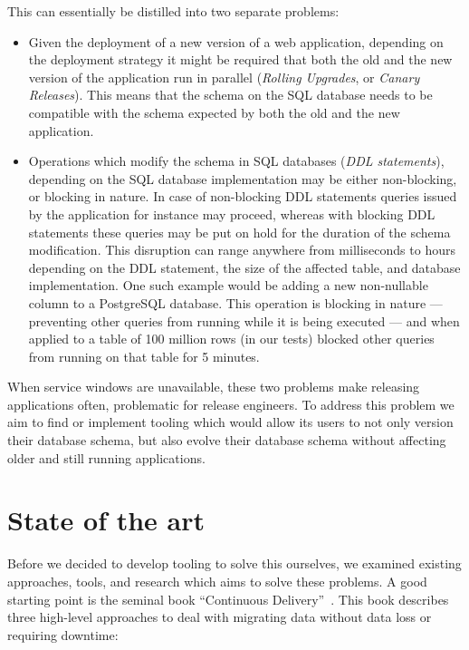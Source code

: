 \documentclass[conference]{IEEEtran}
\begin{document}
This can essentially be distilled into two separate problems:
\begin{itemize}
  \item{Given the deployment of a new version of a web application, depending on the deployment strategy it might be required that both the old and the new version of the application run in parallel (\textit{Rolling Upgrades}, or \textit{Canary Releases}). This means that the schema on the SQL database needs to be compatible with the schema expected by both the old and the new application.}
  \item{Operations which modify the schema in SQL databases (\textit{DDL statements}), depending on the SQL database implementation may be either non-blocking, or blocking in nature. In case of non-blocking DDL statements queries issued by the application for instance may proceed, whereas with blocking DDL statements these queries may be put on hold for the duration of the schema modification. This disruption can range anywhere from milliseconds to hours depending on the DDL statement, the size of the affected table, and database implementation. One such example would be adding a new non-nullable column to a PostgreSQL database. This operation is blocking in nature --- preventing other queries from running while it is being executed --- and when applied to a table of 100 million rows (in our tests) blocked other queries from running on that table for 5 minutes.}
\end{itemize}

When service windows are unavailable, these two problems make releasing applications often, problematic for release engineers. To address this problem we aim to find or implement tooling which would allow its users to not only version their database schema, but also evolve their database schema without affecting older and still running applications.

\section{State of the art} %


Before we decided to develop tooling to solve this ourselves, we examined existing approaches, tools, and research which aims to solve these problems. A good starting point is the seminal book ``Continuous Delivery''~\cite{Humble:2010:CDR:1869904}. This book describes three high-level approaches to deal with migrating data without data loss or requiring downtime:
\end{document}
